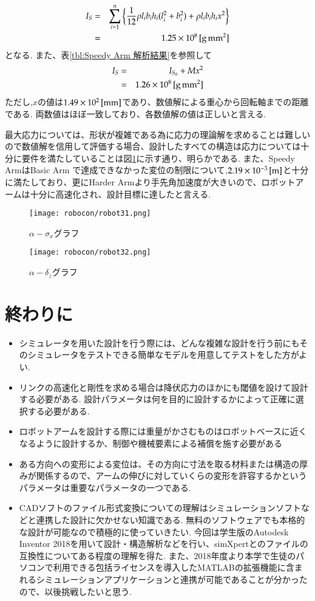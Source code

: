 \documentclass[10pt,b5paper,papersize,dvipdfmx]{jsbook}
\begin{document}
\begin{eqnarray}
  I_S&=&\sum_{i=1}^{n} \left\{ \frac{1}{12} \rho l_ib_ih_i(l_i^2+b_i^2)+\rho l_ib_ih_ix^2 \right\}\\
  &=&1.25\times10^8\tani*{g\,mm^2}
\end{eqnarray}
となる. また、表\ref{tbl:Speedy Arm 解析結果}を参照して
\begin{eqnarray}
  I_S&=&I_{S_0}+Mx^2\\
  &=&1.26\times10^8\tani*{g\,mm^2}
\end{eqnarray}
ただし,$x$の値は$1.49\times10^2 \tani*{mm}$であり、数値解による重心から回転軸までの距離である. 両数値はほぼ一致しており、各数値解の値は正しいと言える.\par
最大応力については、形状が複雑である為に応力の理論解を求めることは難しいので数値解を信用して評価する場合、設計したすべての構造は応力については十分に要件を満たしていることは図\ref{fig:alpha-sigma_xグラフ}に示す通り、明らかである. また、Speedy ArmはBasic Arm で達成できなかった変位の制限について,$2.19\times10^{-3} \tani*{m}$と十分に満たしており、更にHarder Armより手先角加速度が大きいので、ロボットアームは十分に高速化され、設計目標に達したと言える.

\begin{figure}[htbp]
  \centering
  \texttt{[image: robocon/robot31.png]}
  \caption{$\alpha-\sigma_x$グラフ}
  \label{fig:alpha-sigma_xグラフ}
\end{figure}
\begin{figure}[htbp]
  \centering
  \texttt{[image: robocon/robot32.png]}
  \caption{$\alpha-\delta_z$グラフ}
  \label{fig:alpha-delta_zグラフ}
\end{figure}
\section{終わりに}
\begin{itemize}
\item シミュレータを用いた設計を行う際には、どんな複雑な設計を行う前にもそのシミュレータをテストできる簡単なモデルを用意してテストをした方がよい.
\item リンクの高速化と剛性を求める場合は降伏応力のほかにも閾値を設けて設計する必要がある. 設計パラメータは何を目的に設計するかによって正確に選択する必要がある. 
\item ロボットアームを設計する際には重量がかさむものはロボットベースに近くなるように設計するか、制御や機械要素による補償を施す必要がある
\item ある方向への変形による変位は、その方向に寸法を取る材料または構造の厚みが関係するので、アームの伸びに対していくらの変形を許容するかというパラメータは重要なパラメータの一つである.
\item CADソフトのファイル形式変換についての理解はシミュレーションソフトなどと連携した設計に欠かせない知識である. 無料のソフトウェアでも本格的な設計が可能なので積極的に使っていきたい. 今回は学生版のAutodesk Inventor 2018を用いて設計・構造解析などを行い、simXpertとのファイルの互換性についてある程度の理解を得た. また、2018年度より本学で生徒のパソコンで利用できる包括ライセンスを導入したMATLABの拡張機能に含まれるシミュレーションアプリケーションと連携が可能であることが分かったので、以後挑戦したいと思う. 
\end{itemize}
\end{document}
